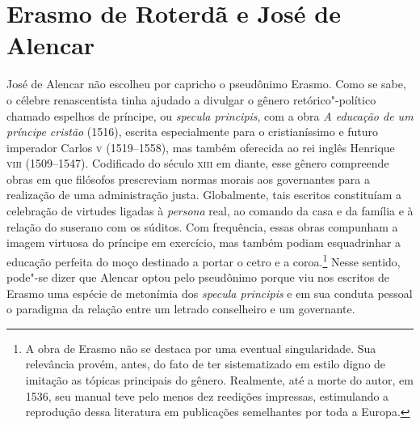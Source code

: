 \section{Erasmo de Roterdã e José de Alencar}

José de Alencar não escolheu por capricho o pseudônimo Erasmo. Como se
sabe, o célebre renascentista tinha ajudado a divulgar o gênero
retórico"-político chamado espelhos de príncipe, ou \textit{specula
principis}, com a obra \textit{A educação de um príncipe cristão}
(1516), escrita especialmente para o cristianíssimo e futuro imperador
Carlos \textsc{v} (1519--1558), mas também oferecida ao rei inglês Henrique
\textsc{viii} (1509--1547). Codificado do século \textsc{xiii} em diante, esse gênero
compreende obras em que filósofos prescreviam normas morais aos
governantes para a realização de uma administração justa. Globalmente,
tais escritos constituíam a celebração de virtudes ligadas à 
\textit{persona} real, ao comando da casa e da família e à  relação do
suserano com os súditos.
Com frequência, essas obras compunham a imagem virtuosa do príncipe em
exercício, mas também podiam esquadrinhar a educação perfeita do moço
destinado a portar o cetro e a coroa.\footnote{ A obra de 
Erasmo não se destaca por uma eventual singularidade. Sua
relevância provém, antes, do fato de ter sistematizado em estilo digno
de imitação as tópicas principais do gênero. Realmente, até a morte do
autor, em 1536, seu manual teve pelo menos dez reedições impressas,
estimulando a reprodução dessa literatura em publicações semelhantes
por toda a Europa.} Nesse sentido, pode"-se dizer que Alencar optou
pelo pseudônimo porque viu nos escritos de Erasmo uma espécie de
metonímia dos \textit{specula principis} e em sua conduta pessoal o
paradigma da relação entre um letrado conselheiro e um governante.

